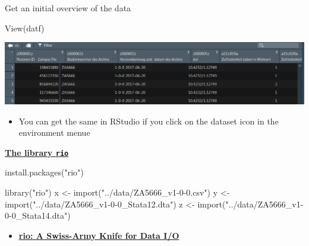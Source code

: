 \documentclass[
  10pt,
  ignorenonframetext,
]{beamer}
\newenvironment{Shaded}{\begin{snugshade}}{\end{snugshade}}
\newcommand{\KeywordTok}[1]{\textcolor[rgb]{0.94,0.87,0.69}{#1}}
\newcommand{\NormalTok}[1]{\textcolor[rgb]{0.80,0.80,0.80}{#1}}
\newcommand{\StringTok}[1]{\textcolor[rgb]{0.80,0.58,0.58}{#1}}
\providecommand{\tightlist}{%
  \setlength{\itemsep}{0pt}\setlength{\parskip}{0pt}}
\begin{document}
\begin{frame}[fragile]{Get an initial overview of the data}
\protect\hypertarget{get-an-initial-overview-of-the-data}{}

\begin{Shaded}
\begin{Highlighting}[]
\KeywordTok{View}\NormalTok{(datf)}
\end{Highlighting}
\end{Shaded}

\includegraphics{figure/firstoverview.PNG}

\begin{itemize}
\tightlist
\item
  You can get the same in RStudio if you click on the dataset icon in
  the environment menue
\end{itemize}

\end{frame}

\begin{frame}[fragile]{\href{https://cran.r-project.org/web/packages/rio/vignettes/rio.html}{\textbf{The
library \texttt{rio}}}}
\protect\hypertarget{the-library-rio}{}

\begin{Shaded}
\begin{Highlighting}[]
\KeywordTok{install.packages}\NormalTok{(}\StringTok{"rio"}\NormalTok{)}
\end{Highlighting}
\end{Shaded}

\begin{Shaded}
\begin{Highlighting}[]
\KeywordTok{library}\NormalTok{(}\StringTok{"rio"}\NormalTok{)}
\NormalTok{x <-}\StringTok{ }\KeywordTok{import}\NormalTok{(}\StringTok{"../data/ZA5666_v1-0-0.csv"}\NormalTok{)}
\NormalTok{y <-}\StringTok{ }\KeywordTok{import}\NormalTok{(}\StringTok{"../data/ZA5666_v1-0-0_Stata12.dta"}\NormalTok{)}
\NormalTok{z <-}\StringTok{ }\KeywordTok{import}\NormalTok{(}\StringTok{"../data/ZA5666_v1-0-0_Stata14.dta"}\NormalTok{)}
\end{Highlighting}
\end{Shaded}

\begin{itemize}
\tightlist
\item
  \href{https://cran.r-project.org/web/packages/rio/README.html}{\textbf{rio:
  A Swiss-Army Knife for Data I/O}}
\end{itemize}

\end{frame}
\end{document}
